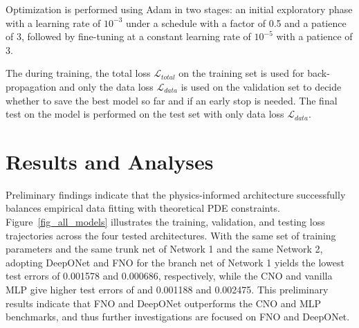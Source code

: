 \documentclass[a4paper,fleqn]{cas-sc}
\begin{document}
Optimization is performed using Adam in two stages: an initial exploratory phase with a learning rate of $10^{-3}$ under a schedule with a factor of 0.5 and a patience of 3, followed by fine-tuning at a constant learning rate of $10^{-5}$ with a patience of 3. 

The during training, the total loss $\mathcal{L}_{total}$ on the training set is used for back-propagation and only the data loss $\mathcal{L}_{data}$ is used on the validation set to decide whether to save the best model so far and if an early stop is needed. The final test on the model is performed on the test set with only data loss $\mathcal{L}_{data}$. 



\vspace{-10pt}\section{Results and Analyses}


Preliminary findings indicate that the physics-informed architecture successfully balances empirical data fitting with theoretical PDE constraints. Figure~\ref{fig_all_models} illustrates the training, validation, and testing loss trajectories across the four tested architectures. With the same set of training parameters and the same trunk net of Network 1 and the same Network 2, adopting DeepONet and FNO for the branch net of Network 1 yields the lowest test errors of 0.001578 and 0.000686, respectively, while the CNO and vanilla MLP give higher test errors of and 0.001188 and 0.002475. This preliminary results indicate that FNO and DeepONet outperforms the CNO and MLP benchmarks, and thus further investigations are focused on FNO and DeepONet.
\end{document}
